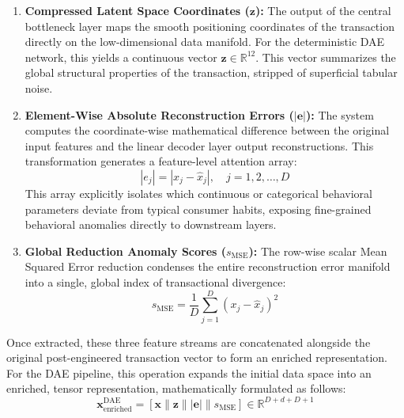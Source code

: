 \begin{enumerate}[leftmargin=2em]
    \item \textbf{Compressed Latent Space Coordinates ($\mathbf{z}$):} The output of the central bottleneck layer maps the smooth positioning coordinates of the transaction directly on the low-dimensional data manifold. For the deterministic DAE network, this yields a continuous vector $\mathbf{z} \in \mathbb{R}^{12}$. This vector summarizes the global structural properties of the transaction, stripped of superficial tabular noise.

    \item \textbf{Element-Wise Absolute Reconstruction Errors ($|\mathbf{e}|$):} The system computes the coordinate-wise mathematical difference between the original input features and the linear decoder layer output reconstructions. This transformation generates a feature-level attention array:
    \begin{equation}\label{eq:7.13}
        |e_j| = |x_j - \hat{x}_j|, \quad j = 1, 2, \ldots, D
    \end{equation}
    This array explicitly isolates which continuous or categorical behavioral parameters deviate from typical consumer habits, exposing fine-grained behavioral anomalies directly to downstream layers.

    \item \textbf{Global Reduction Anomaly Scores ($s_{\text{MSE}}$):} The row-wise scalar Mean Squared Error reduction condenses the entire reconstruction error manifold into a single, global index of transactional divergence:
    \begin{equation}\label{eq:7.14}
        s_{\text{MSE}} = \frac{1}{D}\sum_{j=1}^{D}(x_j - \hat{x}_j)^2
    \end{equation}
\end{enumerate}

Once extracted, these three feature streams are concatenated alongside the original post-engineered transaction vector to form an enriched representation. For the DAE pipeline, this operation expands the initial data space into an enriched, tensor representation, mathematically formulated as follows:
\begin{equation}\label{eq:7.15}
    \mathbf{x}^{\text{DAE}}_{\text{enriched}} = [\mathbf{x} \| \mathbf{z} \| |\mathbf{e}| \| s_{\text{MSE}}] \in \mathbb{R}^{D+d+D+1}
\end{equation}

